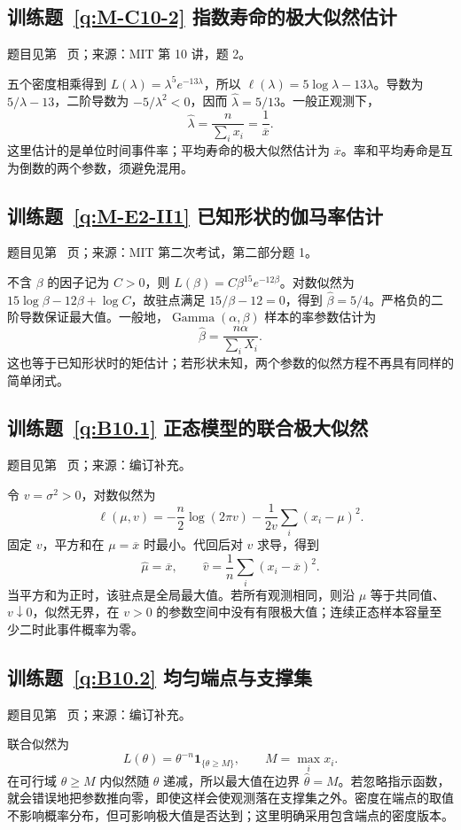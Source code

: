 \subsection*{训练题~\ref{q:M-C10-2} 指数寿命的极大似然估计}\label{a:M-C10-2}{\small 题目见第~\pageref{q:M-C10-2} 页；来源：MIT 第 10 讲，题 2。}
\begin{solve}五个密度相乘得到 $L(\lambda)=\lambda^5e^{-13\lambda}$，所以 $\ell(\lambda)=5\log\lambda-13\lambda$。导数为 $5/\lambda-13$，二阶导数为 $-5/\lambda^2<0$，因而 $\widehat\lambda=5/13$。一般正观测下，\[\widehat\lambda=\frac{n}{\sum_i x_i}=\frac1{\overline x}.\]这里估计的是单位时间事件率；平均寿命的极大似然估计为 $\overline x$。率和平均寿命是互为倒数的两个参数，须避免混用。\end{solve}

\subsection*{训练题~\ref{q:M-E2-II1} 已知形状的伽马率估计}\label{a:M-E2-II1}{\small 题目见第~\pageref{q:M-E2-II1} 页；来源：MIT 第二次考试，第二部分题 1。}
\begin{solve}不含 $\beta$ 的因子记为 $C>0$，则 $L(\beta)=C\beta^{15}e^{-12\beta}$。对数似然为 $15\log\beta-12\beta+\log C$，故驻点满足 $15/\beta-12=0$，得到 $\widehat\beta=5/4$。严格负的二阶导数保证最大值。一般地，$\operatorname{Gamma}(\alpha,\beta)$ 样本的率参数估计为\[\widehat\beta=\frac{n\alpha}{\sum_iX_i}.\]这也等于已知形状时的矩估计；若形状未知，两个参数的似然方程不再具有同样的简单闭式。\end{solve}

\subsection*{训练题~\ref{q:B10.1} 正态模型的联合极大似然}\label{a:B10.1}{\small 题目见第~\pageref{q:B10.1} 页；来源：编订补充。}
\begin{solve}令 $v=\sigma^2>0$，对数似然为\[\ell(\mu,v)=-\frac n2\log(2\pi v)-\frac{1}{2v}\sum_i(x_i-\mu)^2.\]固定 $v$，平方和在 $\mu=\overline x$ 时最小。代回后对 $v$ 求导，得到\[\widehat\mu=\overline x,\qquad\widehat v=\frac1n\sum_i(x_i-\overline x)^2.\]当平方和为正时，该驻点是全局最大值。若所有观测相同，则沿 $\mu$ 等于共同值、$v\downarrow0$，似然无界，在 $v>0$ 的参数空间中没有有限极大值；连续正态样本容量至少二时此事件概率为零。\end{solve}

\subsection*{训练题~\ref{q:B10.2} 均匀端点与支撑集}\label{a:B10.2}{\small 题目见第~\pageref{q:B10.2} 页；来源：编订补充。}
\begin{solve}联合似然为\[L(\theta)=\theta^{-n}\mathbf1_{\{\theta\ge M\}},\qquad M=\max_i x_i.\]在可行域 $\theta\ge M$ 内似然随 $\theta$ 递减，所以最大值在边界 $\widehat\theta=M$。若忽略指示函数，就会错误地把参数推向零，即使这样会使观测落在支撑集之外。密度在端点的取值不影响概率分布，但可影响极大值是否达到；这里明确采用包含端点的密度版本。\end{solve}

